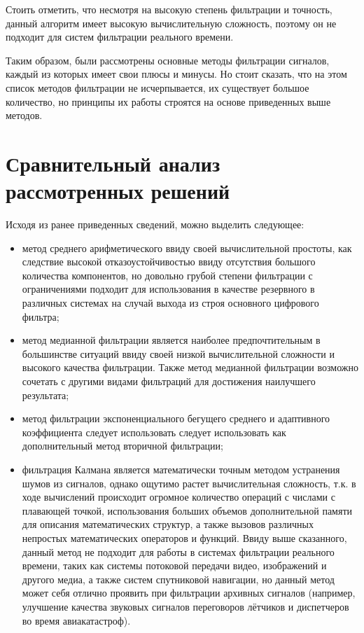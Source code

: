 Стоить отметить, что несмотря на высокую степень фильтрации и точность, данный алгоритм имеет высокую вычислительную сложность, поэтому он не подходит для систем фильтрации реального времени.

Таким образом, были рассмотрены основные методы фильтрации сигналов, каждый из которых имеет свои плюсы и минусы. Но стоит сказать, что на этом список методов фильтрации не исчерпывается, их существует большое количество, но принципы их работы строятся на основе приведенных выше методов.

\newpage

\section{Сравнительный анализ рассмотренных решений}

Исходя из ранее приведенных сведений, можно выделить следующее:
\begin{itemize}
	\item метод среднего арифметического ввиду своей вычислительной простоты, как следствие высокой отказоустойчивостью ввиду отсутствия большого количества компонентов, но довольно грубой степени фильтрации с ограничениями подходит для использования в качестве резервного в различных системах на случай выхода из строя основного цифрового фильтра;
	\item метод медианной фильтрации является наиболее предпочтительным в большинстве ситуаций ввиду своей низкой вычислительной сложности и высокого качества фильтрации. Также метод медианной фильтрации возможно сочетать с другими видами фильтраций для достижения наилучшего результата;
	\item метод фильтрации экспоненциального бегущего среднего и адаптивного коэффициента следует использовать следует использовать как дополнительный метод вторичной фильтрации;
	\item фильтрация Калмана является математически точным методом устранения шумов из сигналов, однако ощутимо растет вычислительная сложность, т.к. в ходе вычислений происходит огромное количество операций с числами с плавающей точкой, использования больших объемов дополнительной памяти для описания математических структур, а также вызовов различных непростых математических операторов и функций. Ввиду выше сказанного, данный метод не подходит для работы в системах фильтрации реального времени, таких как системы потоковой передачи видео, изображений и другого медиа, а также систем спутниковой навигации, но данный метод может себя отлично проявить при фильтрации архивных сигналов (например, улучшение качества звуковых сигналов переговоров лётчиков и диспетчеров во время авиакатастроф).
	
\end{itemize}






